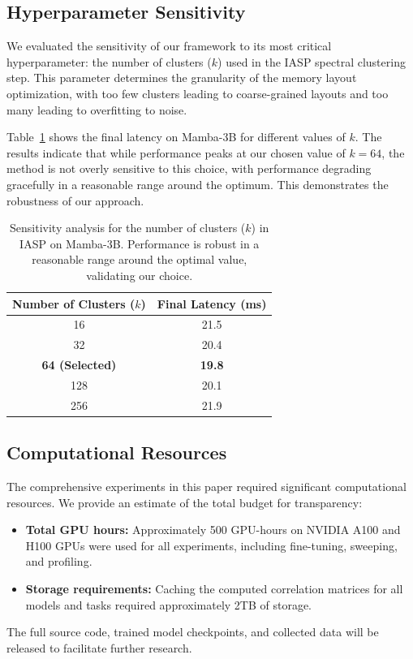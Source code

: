 \documentclass{article}
\begin{document}
\subsection{Hyperparameter Sensitivity}
We evaluated the sensitivity of our framework to its most critical hyperparameter: the number of clusters ($k$) used in the IASP spectral clustering step. This parameter determines the granularity of the memory layout optimization, with too few clusters leading to coarse-grained layouts and too many leading to overfitting to noise. 

Table~\ref{tab:hyperparam_sensitivity} shows the final latency on Mamba-3B for different values of $k$. The results indicate that while performance peaks at our chosen value of $k=64$, the method is not overly sensitive to this choice, with performance degrading gracefully in a reasonable range around the optimum. This demonstrates the robustness of our approach.

\begin{table}[hbt!]
\centering
\caption{Sensitivity analysis for the number of clusters ($k$) in IASP on Mamba-3B. Performance is robust in a reasonable range around the optimal value, validating our choice.}
\label{tab:hyperparam_sensitivity}
\begin{tabular}{cc}
\toprule
\textbf{Number of Clusters ($k$)} & \textbf{Final Latency (ms)} \\
\midrule
16 & 21.5 \\
32 & 20.4 \\
\textbf{64 (Selected)} & \textbf{19.8} \\
128 & 20.1 \\
256 & 21.9 \\
\bottomrule
\end{tabular}
\end{table}

\subsection{Computational Resources}
The comprehensive experiments in this paper required significant computational resources. We provide an estimate of the total budget for transparency:
\begin{itemize}
    \item \textbf{Total GPU hours:} Approximately 500 GPU-hours on NVIDIA A100 and H100 GPUs were used for all experiments, including fine-tuning, sweeping, and profiling.
    \item \textbf{Storage requirements:} Caching the computed correlation matrices for all models and tasks required approximately 2TB of storage.
\end{itemize}
The full source code, trained model checkpoints, and collected data will be released to facilitate further research.
\end{document}
